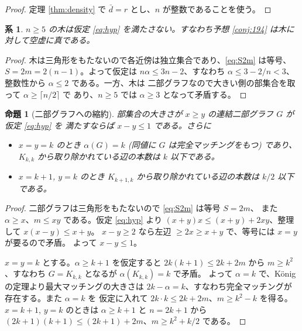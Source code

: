 \documentclass[paper=a4,fontsize=10.5pt,jafontsize=10.5pt]{jlreq}
\theoremstyle{plain}
\newtheorem{proposition}[theorem]{命題}
\newtheorem{corollary}[theorem]{系}
\theoremstyle{definition}
\begin{document}
\begin{proof}
定理 \ref{thm:density} で $\bar{d} = r$ とし、$n$ が整数であることを使う。
\end{proof}

\begin{corollary}\label{cor:tree}
$n \ge 5$ の木は仮定 \eqref{eq:hyp} を満たさない。すなわち予想
\ref{conj:194} は木に対して空虚に真である。
\end{corollary}

\begin{proof}
木は三角形をもたないので各近傍は独立集合であり、\eqref{eq:S2m} は等号、
$S = 2m = 2(n-1)$。よって仮定は $n\alpha \le 3n - 2$、すなわち
$\alpha \le 3 - 2/n < 3$、整数性から $\alpha \le 2$ である。一方、木は
二部グラフなので大きい側の部集合を取って $\alpha \ge \lceil n/2 \rceil$ で
あり、$n \ge 5$ では $\alpha \ge 3$ となって矛盾する。
\end{proof}

\begin{proposition}[二部グラフへの縮約]\label{prop:bip}
部集合の大きさが $x \ge y$ の連結二部グラフ $G$ が仮定 \eqref{eq:hyp} を
満たすならば $x - y \le 1$ である。さらに
\begin{itemize}
\item $x = y = k$ のとき $\alpha(G) = k$ (同値に $G$ は完全マッチングをもつ)
      であり、$K_{k,k}$ から取り除かれている辺の本数は $k$ 以下である。
\item $x = k+1$, $y = k$ のとき $K_{k+1,k}$ から取り除かれている辺の本数は
      $k/2$ 以下である。
\end{itemize}
\end{proposition}

\begin{proof}
二部グラフは三角形をもたないので \eqref{eq:S2m} は等号 $S = 2m$、
また $\alpha \ge x$、$m \le xy$ である。仮定 \eqref{eq:hyp} より
$(x+y)x \le (x+y) + 2xy$、整理して $x(x-y) \le x+y$。
$x - y \ge 2$ なら左辺 $\ge 2x \ge x+y$ で、等号には $x=y$ が要るので矛盾。
よって $x-y \le 1$。

$x=y=k$ とする。$\alpha \ge k+1$ を仮定すると $2k(k+1) \le 2k + 2m$ から
$m \ge k^2$、すなわち $G = K_{k,k}$ となるが $\alpha(K_{k,k}) = k$ で矛盾。
よって $\alpha = k$ で、König の定理より最大マッチングの大きさは
$2k - \alpha = k$、すなわち完全マッチングが存在する。また $\alpha = k$ を
仮定に入れて $2k \cdot k \le 2k + 2m$、$m \ge k^2 - k$ を得る。
$x = k+1$, $y = k$ のときは $\alpha \ge k+1$ と $n = 2k+1$ から
$(2k+1)(k+1) \le (2k+1) + 2m$、$m \ge k^2 + k/2$ である。
\end{proof}
\end{document}
